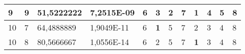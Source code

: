 \documentclass[conference]{IEEEtran}
\begin{document}
\begin{table*}[]
\begin{tabular}{|llll|llllllll|}
\multicolumn{1}{|l|}{9}                                                     & \multicolumn{1}{l|}{9}                                                        & \multicolumn{1}{l|}{51,5222222}                                                   & 7,2515E-09                     & \multicolumn{1}{l|}{6}                                                  & \multicolumn{1}{l|}{3}                                                  & \multicolumn{1}{l|}{2}                                                  & \multicolumn{1}{l|}{7}                                                  & \multicolumn{1}{l|}{\textbf{1}}                                         & \multicolumn{1}{l|}{4}                                                  & \multicolumn{1}{l|}{5}                                                  & 8                          \\ \hline
\multicolumn{1}{|l|}{10}                                                    & \multicolumn{1}{l|}{7}                                                        & \multicolumn{1}{l|}{64,4888889}                                                   & 1,9049E-11                     & \multicolumn{1}{l|}{6}                                                  & \multicolumn{1}{l|}{\textbf{1}}                                         & \multicolumn{1}{l|}{5}                                                  & \multicolumn{1}{l|}{7}                                                  & \multicolumn{1}{l|}{2}                                                  & \multicolumn{1}{l|}{3}                                                  & \multicolumn{1}{l|}{4}                                                  & 8                          \\ \hline
\multicolumn{1}{|l|}{10}                                                    & \multicolumn{1}{l|}{8}                                                        & \multicolumn{1}{l|}{80,5666667}                                                   & 1,0556E-14                     & \multicolumn{1}{l|}{6}                                                  & \multicolumn{1}{l|}{2}                                                  & \multicolumn{1}{l|}{5}                                                  & \multicolumn{1}{l|}{7}                                                  & \multicolumn{1}{l|}{\textbf{1}}                                         & \multicolumn{1}{l|}{3}                                                  & \multicolumn{1}{l|}{4}                                                  & 8                          \\ \hline

\end{tabular}
\end{table*}
\end{document}
